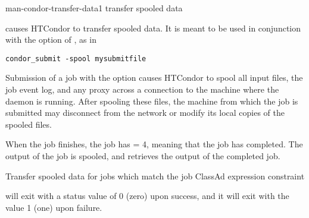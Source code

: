 \begin{ManPage}{}{man-condor-transfer-data}{1}
{transfer spooled data}

\Synopsis {}
\ToolArgsBase

\ToolLocate
\ToolJobs
\Bar{}  \Dots

\ToolLocate
\ToolAll

\Description
{} causes HTCondor to transfer spooled
data.
It is meant to be used in conjunction with the 
option of , as in
\footnotesize
\begin{verbatim}
condor_submit -spool mysubmitfile
\end{verbatim}
\normalsize
Submission of a job with the  option causes HTCondor
to spool all input files, the job event log, and any proxy across
a connection to the machine where the  daemon
is running.
After spooling these files,
the machine from which the job is submitted may
disconnect from the network
or modify its local copies of the spooled files.

When the job finishes,
the job has  = 4, meaning that the job has
completed.
The output of the job is spooled,
and
 retrieves the output of the completed
job.



\begin{Options}
  \ToolArgsBaseDesc
  \ToolLocateDesc
   {Transfer spooled data for
  jobs which match the job ClassAd expression constraint}
\end{Options}

\ExitStatus

 will exit with a status value of 0 (zero) upon success,
and it will exit with the value 1 (one) upon failure.

\end{ManPage}
